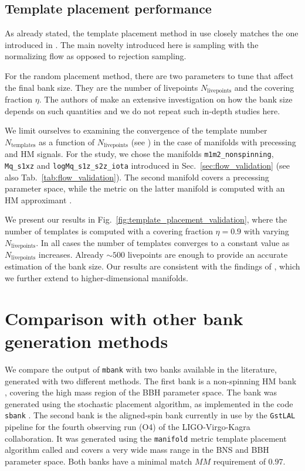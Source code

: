 \documentclass[twocolumn,showpacs,preprintnumbers,nofootinbib,prd,
superscriptaddress,10pt]{revtex4-2}
\begin{document}
\subsection{Template placement performance} \label{sec:template_placement}

As already stated, the template placement method in use closely matches the one introduced in \cite{Coogan:2022qxs}.
The main novelty introduced here is sampling with the normalizing flow as opposed to rejection sampling.

For the random placement method, there are two parameters to tune that affect the final bank size. They are the number of livepoints $N_\text{livepoints}$ and the covering fraction $\eta$.
The authors of \cite{Coogan:2022qxs} make an extensive investigation on how the bank size depends on such quantities and we do not repeat such in-depth studies here.

We limit ourselves to examining the convergence of the template number $N_\text{templates}$ as a function of $N_\text{livepoints}$ (see \cite[Fig.~4 (right)]{Coogan:2022qxs}) in the case of manifolds with precessing and HM signals.
For the study, we chose the manifolds \texttt{m1m2\_nonspinning}, \texttt{Mq\_s1xz} and \texttt{logMq\_s1z\_s2z\_iota} introduced in Sec.~\ref{sec:flow_validation} (see also Tab.~\ref{tab:flow_validation}). The second manifold covers a precessing parameter space, while the metric on the latter manifold is computed with an HM approximant \cite{Garcia-Quiros:2020qpx}.

We present our results in Fig.~\ref{fig:template_placement_validation}, where the number of templates is computed with a covering fraction $\eta = 0.9$ with varying $N_\text{livepoints}$.
In all cases the number of templates converges to a constant value as $N_\text{livepoints}$ increases. Already $\sim 500$ livepoints are enough to provide an accurate estimation of the bank size.
Our results are consistent with the findings of \cite{Coogan:2022qxs}, which we further extend to higher-dimensional manifolds.

\section{Comparison with other bank generation methods} \label{sec:other_methods}

We compare the output of \texttt{mbank} with two banks available in the literature, generated with two different methods.
The first bank is a non-spinning HM bank \cite{Harry:2017weg}, covering the high mass region of the BBH parameter space. The bank was generated using the stochastic placement algorithm, as implemented in the code \texttt{sbank} \cite{Ajith:2012mn}.
The second bank is the aligned-spin bank \cite{Sakon:2022ibh} currently in use by the \texttt{GstLAL} pipeline \cite{PhysRevD.95.042001, Sachdev:2019vvd} for the fourth observing run (O4) of the LIGO-Virgo-Kagra collaboration. It was generated using the \texttt{manifold} \cite{Hanna:2022zpk} metric template placement algorithm called and covers a very wide mass range in the BNS and BBH parameter space.
Both banks have a minimal match $MM$ requirement of $0.97$.
\end{document}
